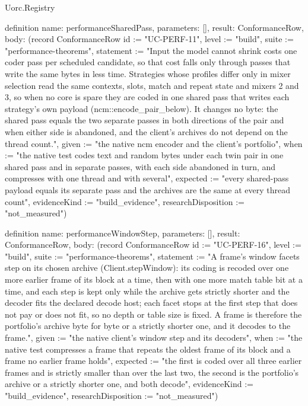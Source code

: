 \begin{lexlean}{Uorc.Registry}
\begin{semanticmodule}
definition{
  name: performanceSharedPass,
  parameters: [],
  result: ConformanceRow,
  body: (record ConformanceRow {id := "UC-PERF-11", level := "build", suite := "performance-theorems", statement := "Input the model cannot shrink costs one coder pass per scheduled candidate, so that cost falls only through passes that write the same bytes in less time. Strategies whose profiles differ only in mixer selection read the same contexts, slots, match and repeat state and mixers 2 and 3, so when no core is spare they are coded in one shared pass that writes each strategy's own payload (ncm::encode_pair_below). It changes no byte: the shared pass equals the two separate passes in both directions of the pair and when either side is abandoned, and the client's archives do not depend on the thread count.", given := "the native ncm encoder and the client's portfolio", when := "the native test codes text and random bytes under each twin pair in one shared pass and in separate passes, with each side abandoned in turn, and compresses with one thread and with several", expected := "every shared-pass payload equals its separate pass and the archives are the same at every thread count", evidenceKind := "build_evidence", researchDisposition := "not_measured"})
}

definition{
  name: performanceWindowStep,
  parameters: [],
  result: ConformanceRow,
  body: (record ConformanceRow {id := "UC-PERF-16", level := "build", suite := "performance-theorems", statement := "A frame's window facets step on its chosen archive (Client.stepWindow): its coding is recoded over one more earlier frame of its block at a time, then with one more match table bit at a time, and each step is kept only while the archive gets strictly shorter and the decoder fits the declared decode host; each facet stops at the first step that does not pay or does not fit, so no depth or table size is fixed. A frame is therefore the portfolio's archive byte for byte or a strictly shorter one, and it decodes to the frame.", given := "the native client's window step and its decoders", when := "the native test compresses a frame that repeats the oldest frame of its block and a frame no earlier frame holds", expected := "the first is coded over all three earlier frames and is strictly smaller than over the last two, the second is the portfolio's archive or a strictly shorter one, and both decode", evidenceKind := "build_evidence", researchDisposition := "not_measured"})
}


\end{semanticmodule}
\end{lexlean}
